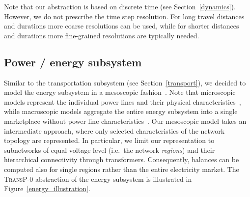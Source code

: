 
Note that our abstraction is based on discrete time (see Section~\ref{dynamics}). However, we do not prescribe the time step resolution. For long travel distances and durations more coarse resolutions can be used, while for shorter distances and durations more fine-grained resolutions are typically needed.

\subsection{Power / energy subsystem}
\label{energy_system}

Similar to the transportation subsystem (see Section~\ref{transport}), we decided to model the energy subsystem in a mesoscopic fashion~\cite{Hackenberg2012}. Note that microscopic models represent the individual power lines and their physical characteristics~\cite{Dommel1968}, while macroscopic models aggregate the entire energy subsystem into a single marketplace without power line characteristics~\cite{Castronuovo2004}. Our mesoscopic model takes an intermediate approach, where only selected characteristics of the network topology are represented. In particular, we limit our representation to subnetworks of equal voltage level (i.e.\ the network \textit{regions}) and their hierarchical connectivity through transformers. Consequently, balances can be computed also for single regions rather than the entire electricity market. The \textsc{TransP-0} abstraction of the energy subsystem is illustrated in Figure~\ref{energy_illustration}.

